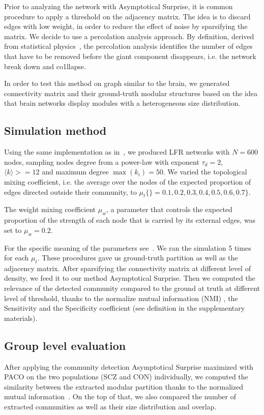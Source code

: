 Prior to analyzing the network with Asymptotical Surprise, it is common procedure to apply a threshold on the adjacency matrix. 
The idea is to discard edges with low weight, in order to reduce the effect of noise by sparsifying the matrix. 
We decide to use a percolation analysis approach. 
By definition, derived from statistical physics~\cite{stauffer1994,alexander-bloch2010,gallos2012,fornito2016}, the percolation analysis identifies the number of edges that have to be removed before the giant component disappears, i.e. the network break down and co1llapse.

In order to test this method on graph similar to the brain, we generated connectivity matrix and their ground-truth modular structures based on the idea that brain networks display modules with a heterogeneous size distribution.

\subsection{Simulation method}
Using the same implementation as in~\cite{lancichinetti2008}, we produced LFR networks with $N = 600$ nodes, sampling nodes degree from a power-law with exponent $\tau_d = 2$, $\langle k \rangle> = 12$ and maximum degree $\max(k_i) = 50$.
We varied the topological mixing coefficient, i.e. the average over the nodes of the expected proportion of edges directed outside their community, to $\mu_t \{\}= 0.1,0.2,0.3,0.4,0.5,0.6,0.7\}$.

The weight mixing coefficient $\mu_w$, a parameter that controls the expected proportion of the strength of each node that is carried by its external edges, was set to $\mu_w=0.2$.

For the specific meaning of the parameters see~\cite{lancichinetti2008,lancichinetti2009a}.
We ran the simulation 5 times for each $\mu_t$.
These procedures gave us ground-truth partition as well as the adjacency matrix. 
After sparsifying the connectivity matrix at different level of density, we feed it to our method Asymptotical Surprise.
Then we computed the relevance of the detected community compared to the ground at truth at different level of threshold, thanks to the normalize mutual information (NMI) , the Sensitivity and the Specificity coefficient (see definition in the supplementary materials).

\subsection{Group level evaluation}
After applying the community detection Asymptotical Surprise maximized with PACO on the two populations (SCZ and CON) individually, we computed the similarity between the extracted modular partition thanks to the normalized mutual information~\cite{danon2005}.
On the top of that, we also compared the number of extracted communities as well as their size distribution and overlap.

